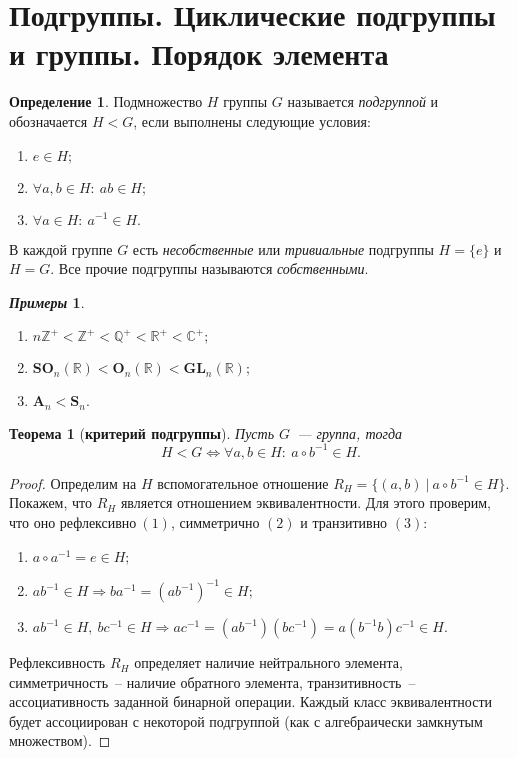 \documentclass[a4paper, 14pt]{extarticle}
\newcommand{\n}{\par}
\newcommand{\integers}{\mathbb{Z}}
\newcommand{\rationals}{\mathbb{Q}}
\newcommand{\real}{\mathbb{R}}
\newcommand{\complex}{\mathbb{C}}
\newcommand{\GL}{\mathbf{GL}}
\newcommand{\Orth}{\mathbf{O}}
\newcommand{\SOrth}{\mathbf{SO}}
\newcommand{\symmetrical}{\mathbf{S}}
\newcommand{\alternating}{\mathbf{A}}
\newcommand{\suchthat}{{:}{ } \ }
\theoremstyle{definition}
\newtheorem*{exmpls}{\textit{Примеры}}
\newtheorem{definition}{Определение}
\theoremstyle{plain}
\newtheorem*{theorem*}{Теорема}
\numberwithin{theorem}{section}
\numberwithin{definition}{section}
\numberwithin{statement}{section}
\numberwithin{lemma}{section}
\numberwithin{consequence}{section}
\begin{document}
	\section{Подгруппы. Циклические подгруппы и группы. Порядок элемента}
	\begin{definition}	
		Подмножество $H$ группы $G$ называется \textit{подгруппой} и обозначается $H < G$, если выполнены следующие условия:
		\begin{enumerate}
			\setlength\itemsep{0.1em}
			\item $e \in H;$
			\item $\forall a,b \in H\suchthat ab \in H;$
			\item $\forall a \in H\suchthat a^{-1} \in H.$
		\end{enumerate}
	\end{definition}
	В каждой группе $G$ есть \textit{несобственные} или \textit{тривиальные} подгруппы $H = \{e\}$ и $H = G$. Все прочие подгруппы называются \textit{собственными}.
	\begin{exmpls}
		\
		\begin{enumerate}
			\setlength\itemsep{0.1em}
			\item ${n\integers^ + < \integers ^ + < \rationals ^ + < \real ^ + < \complex ^ +;}$
			\item ${\SOrth_n(\real) < \Orth_n(\real) < \GL_n(\real);}$
			\item ${\alternating_n < \symmetrical_n.}$
		\end{enumerate}
	\end{exmpls}
	\begin{theorem*}[\textbf{критерий подгруппы}]
		Пусть $G$~--- группа, тогда
		\begin{equation*}
			H < G \Longleftrightarrow \forall a,b \in H\suchthat a \circ b^{-1} \in H.
		\end{equation*}
	\end{theorem*}
	\begin{proof}
		Определим на $H$ вспомогательное отношение ${R_H = \{(a,b)\ | \ a \circ b^{-1} \in H\}}.$ Покажем, что $R_H$ является отношением эквивалентности. Для этого проверим, что оно ${\text{рефлексивно} \ (1)}$, симметрично $(2)$ и транзитивно $(3)$:
		\begin{enumerate}
			\setlength\itemsep{0.1em}
			\item $a \circ a^{-1} = e \in H;$
			\item $ab^{-1} \in H \Longrightarrow b a^{-1} = (ab^{-1})^{-1} \in H;$
			\item $ab^{-1} \in H, \ bc^{-1} \in H \Longrightarrow ac^{-1} = (ab^{-1})(bc^{-1}) = a(b^{-1}b)c^{-1} \in H.$
		\end{enumerate} \n
		
		Рефлексивность $R_H$ определяет наличие нейтрального элемента, симметричность~-- наличие обратного элемента, транзитивность~-- ассоциативность заданной бинарной операции. Каждый класс эквивалентности будет ассоциирован с некоторой подгруппой (как с алгебраически замкнутым множеством). 
	\end{proof}
\end{document}

